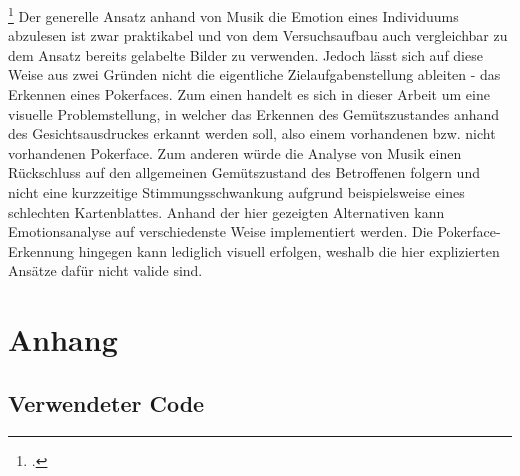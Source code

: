 \documentclass[12pt, a4paper]{report}
\begin{document}
\footcite[Vgl. ][Abstract]{EmotionInSound}
Der generelle Ansatz anhand von Musik die Emotion eines Individuums abzulesen ist zwar praktikabel und von dem Versuchsaufbau auch vergleichbar zu dem Ansatz bereits gelabelte Bilder zu verwenden. Jedoch lässt sich auf diese Weise aus zwei Gründen nicht die eigentliche Zielaufgabenstellung ableiten - das Erkennen eines Pokerfaces. Zum einen handelt es sich in dieser Arbeit um eine visuelle Problemstellung, in welcher das Erkennen des Gemütszustandes anhand des Gesichtsausdruckes erkannt werden soll, also einem vorhandenen bzw. nicht vorhandenen Pokerface. Zum anderen würde die Analyse von Musik einen Rückschluss auf den allgemeinen Gemütszustand des Betroffenen folgern und nicht eine kurzzeitige Stimmungsschwankung aufgrund beispielsweise eines schlechten Kartenblattes. \newline
Anhand der hier gezeigten Alternativen kann Emotionsanalyse auf verschiedenste Weise implementiert werden. Die Pokerface-Erkennung hingegen kann lediglich visuell erfolgen, weshalb die hier explizierten Ansätze dafür nicht valide sind.

\let\cleardoublepage\relax
\newpage
\printbibheading
\thispagestyle{empty}
\pagestyle{empty}
\printbibliography[type=book,heading=subbibliography,title={Literaturquellen}]
\newpage
\printbibliography[type=misc,heading=subbibliography,title={Sonstige Quellen}]
\newpage


\chapter*{Anhang}
\thispagestyle{empty}
\section*{Verwendeter Code}
  
  
  \newpage
  
  \newpage
  
  \newpage
  
  \newpage
  
  \newpage
  
  \newpage
  
  \newpage
\end{document}
